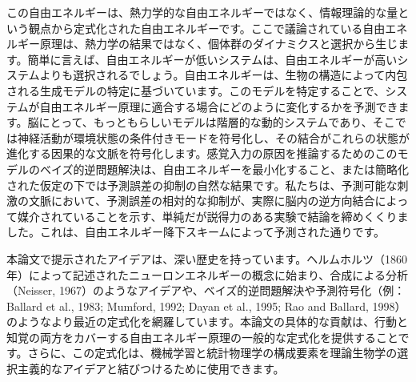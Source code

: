 \documentclass{article}
\begin{document}
この自由エネルギーは、熱力学的な自由エネルギーではなく、情報理論的な量という観点から定式化された自由エネルギーです。ここで議論されている自由エネルギー原理は、熱力学の結果ではなく、個体群のダイナミクスと選択から生じます。簡単に言えば、自由エネルギーが低いシステムは、自由エネルギーが高いシステムよりも選択されるでしょう。自由エネルギーは、生物の構造によって内包される生成モデルの特定に基づいています。このモデルを特定することで、システムが自由エネルギー原理に適合する場合にどのように変化するかを予測できます。脳にとって、もっともらしいモデルは階層的な動的システムであり、そこでは神経活動が環境状態の条件付きモードを符号化し、その結合がこれらの状態が進化する因果的な文脈を符号化します。感覚入力の原因を推論するためのこのモデルのベイズ的逆問題解決は、自由エネルギーを最小化すること、または簡略化された仮定の下では予測誤差の抑制の自然な結果です。私たちは、予測可能な刺激の文脈において、予測誤差の相対的な抑制が、実際に脳内の逆方向結合によって媒介されていることを示す、単純だが説得力のある実験で結論を締めくくりました。これは、自由エネルギー降下スキームによって予測された通りです。

本論文で提示されたアイデアは、深い歴史を持っています。ヘルムホルツ（1860年）によって記述されたニューロンエネルギーの概念に始まり、合成による分析（Neisser, 1967）のようなアイデアや、ベイズ的逆問題解決や予測符号化（例：Ballard et al., 1983; Mumford, 1992; Dayan et al., 1995; Rao and Ballard, 1998）のようなより最近の定式化を網羅しています。本論文の具体的な貢献は、行動と知覚の両方をカバーする自由エネルギー原理の一般的な定式化を提供することです。さらに、この定式化は、機械学習と統計物理学の構成要素を理論生物学の選択主義的なアイデアと結びつけるために使用できます。
\end{document}

